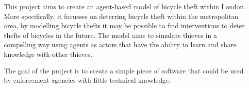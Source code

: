 This project aims to create an agent-based model of bicycle theft within London. More specifically, it focusses on deterring bicycle theft within the metropolitan area, by modelling bicycle thefts it may be possible to find interventions to deter thefts of bicycles in the future. The model aims to simulate thieves in a compelling way using agents as actors that have the ability to learn and share knowledge with other thieves. \par

The goal of the project is to create a simple piece of software that could be used by enforcement agencies with little technical knowledge. 


